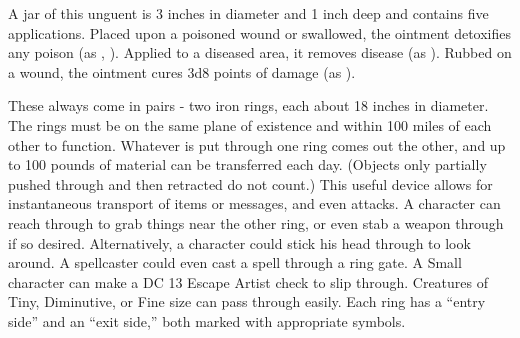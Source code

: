 {

 A jar of this unguent is 3 inches in diameter and 1 inch deep and contains five applications. Placed upon a poisoned wound or swallowed, the ointment detoxifies any poison (as , ). Applied to a diseased area, it removes disease (as ). Rubbed on a wound, the ointment cures 3d8 points of damage (as ).


 These always come in pairs - two iron rings, each about 18 inches in diameter. The rings must be on the same plane of existence and within 100 miles of each other to function. Whatever is put through one ring comes out the other, and up to 100 pounds of material can be transferred each day. (Objects only partially pushed through and then retracted do not count.) This useful device allows for instantaneous transport of items or messages, and even attacks. A character can reach through to grab things near the other ring, or even stab a weapon through if so desired. Alternatively, a character could stick his head through to look around. A spellcaster could even cast a spell through a ring gate. A Small character can make a DC 13 Escape Artist check to slip through. Creatures of Tiny, Diminutive, or Fine size can pass through easily. Each ring has a ``entry side'' and an ``exit side,'' both marked with appropriate symbols.


\begin{comment}
Robe of the Archmagi} This normal-appearing garment can be white (01?45 on d\%, good alignment), gray (46?75, neither good nor evil alignment), or black (76?100, evil alignment). Its wearer, if an arcane spellcaster, gains the following powers.
\begin{itemize*}
\item \plus5 armor bonus to AC.
\item Spell resistance 18.
\item \plus4 resistance bonus on all saving throws.
\item \plus2 enhancement bonus on caster level checks made to overcome spell resistance.
\end{itemize*}


\end{comment}}
